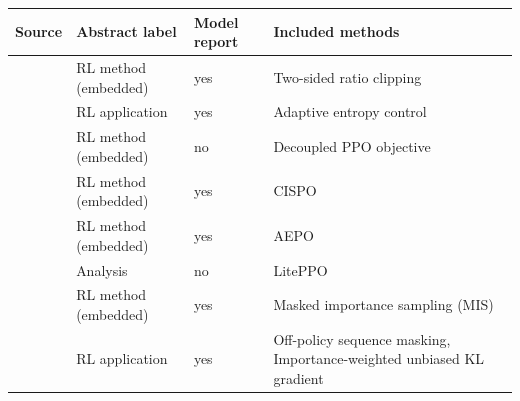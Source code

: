 \begin{tabularx}{\linewidth}{l l l >{\raggedright\arraybackslash}X}
\toprule
Source & Abstract label & Model report & Included methods \\
\midrule
\citet{arxiv250507291} & RL method (embedded) & yes & Two-sided ratio clipping \\
\citet{arxiv250522312} & RL application & yes & Adaptive entropy control \\
\citet{arxiv250524298} & RL method (embedded) & no & Decoupled PPO objective \\
\citet{arxiv250613585} & RL method (embedded) & yes & CISPO \\
\citet{arxiv250805731} & RL method (embedded) & yes & AEPO \\
\citet{arxiv250808221} & Analysis & no & LitePPO \\
\citet{arxiv251018855} & RL method (embedded) & yes & Masked importance sampling (MIS) \\
\citet{arxiv251202556} & RL application & yes & Off-policy sequence masking, Importance-weighted unbiased KL gradient \\
\bottomrule
\end{tabularx}
